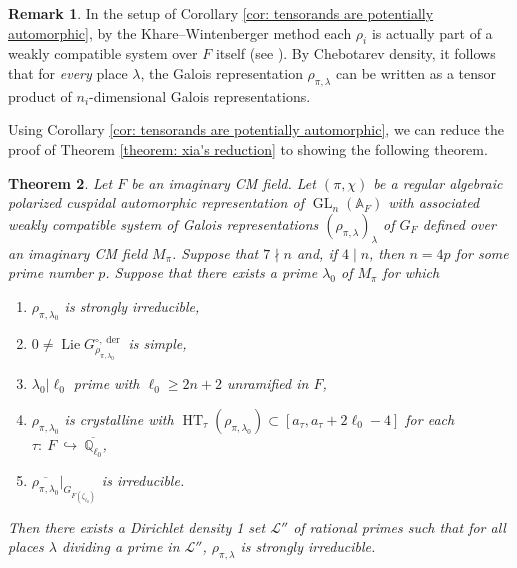 \documentclass{amsart}
\newtheorem{theorem}{Theorem}[section]
\theoremstyle{definition}
\newtheorem{remark}[theorem]{Remark}
\numberwithin{equation}{section} %
\newcommand{\GL}{\operatorname{GL}}
\newcommand{\Lie}{\operatorname{Lie}}
\newcommand{\der}{\operatorname{der}}
\newcommand{\Qlzerobar}{\ensuremath{\overline{\mathbb{Q}_{\ell_0}}}}
\newcommand{\HT}{\operatorname{HT}}
\newcommand{\bb}[1]{\mathbb{#1}}
\newcommand{\mc}[1]{\mathcal{#1}}
\newcommand{\ol}[1]{\overline{#1}}
\begin{document}
\begin{remark}
In the setup of Corollary \ref{cor: tensorands are potentially automorphic}, by the Khare--Wintenberger method each $\rho_i$ is actually part of a weakly compatible system over $F$ itself (see \cite[Theorem 5.5.1]{BLGGT14}).
By Chebotarev density, it follows that for \emph{every} place $\lambda$, the Galois representation $\rho_{\pi,\lambda}$ can be written as a tensor product of $n_i$-dimensional Galois representations. 
\end{remark}

Using Corollary \ref{cor: tensorands are potentially automorphic}, we can reduce the proof of Theorem \ref{theorem: xia's reduction} to showing the following theorem.

\begin{theorem} \label{thm: reduction to simple tensorands}
    Let \( F \) be an imaginary CM field. Let \( (\pi,\chi) \) be a regular algebraic polarized cuspidal automorphic representation of \( \GL_n(\bb{A}_F) \) with associated weakly compatible system of Galois representations \( (\rho_{\pi,\lambda})_\lambda \) of \( G_F \) defined over an imaginary CM field \( M_\pi \).
    Suppose that \( 7\nmid n \) and, if \( 4\mid n \), then $n = 4p$ for some prime number $p$.
    Suppose that there exists a prime $\lambda_0$ of $M_\pi$ for which
    \begin{enumerate}
        \item $\rho_{\pi,\lambda_0}$ is strongly irreducible,
        \item $0 \neq \Lie G_{\rho_{\pi,\lambda_0}}^{\circ, \der}$ is simple,
        \item $\lambda_0 | \ell_0$ prime with $\ell_0 \geq 2n+2$ unramified in $F$,
        \item $\rho_{\pi,\lambda_0}$ is crystalline with $\HT_\tau(\rho_{\pi,\lambda_0}) \subset [a_\tau, a_\tau + 2 \ell_0 - 4]$ for each $\tau:~F~\hookrightarrow~\Qlzerobar$,
        \item $\ol{\rho_{\pi,\lambda_0}}|_{G_{F(\zeta_{\ell_0})}}$ is irreducible.
    \end{enumerate}
    Then there exists a Dirichlet density 1 set $\mathcal{L}''$ of rational primes such that for all places \( \lambda \) dividing a prime in $\mc{L}''$, \( \rho_{\pi,\lambda} \) is strongly irreducible.    
\end{theorem}
\end{document}
